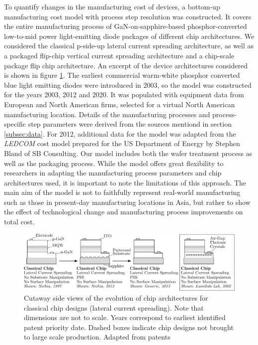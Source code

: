 \documentclass[a4paper,nocompress]{spie}  %
\begin{document}
        To quantify changes in the manufacturing cost of devices, a bottom-up manufacturing cost model with process step resolution was constructed. It covers the entire manufacturing process of GaN-on-sapphire-based phosphor-converted low-to-mid power light-emitting diode packages of different chip architectures. We considered the classical p-side-up lateral current spreading architecture, as well as a packaged flip-chip vertical current spreading architecture and a chip-scale package flip chip architecture. An excerpt of the device architectures considered is shown in figure \ref{fig:chip_arch}. The earliest commercial warm-white phosphor converted blue light emitting diodes were introduced in 2003, so the model was constructed for the years 2003, 2012 and 2020. It was populated with equipment data from European and North American firms, selected for a virtual North American manufacturing location. Details of the manufacturing processes and process-specific step parameters were derived from the sources mentiond in section \ref{subsec:data}. For 2012, additional data for the model was adapted from the \textit{LEDCOM} cost model prepared for the US Department of Energy by Stephen Bland of SB Consulting\cite{ledcomv2}. Our model includes both the wafer treatment process as well as the packaging process. While the model offers great flexibility to researchers in adapting the manufacturing process parameters and chip architectures used, it is important to note the limitations of this approach. The main aim of the model is not to faithfully represent real-world manufacturing such as those in present-day manufacturing locations in Asia, but rather to show the effect of technological change and manufacturing process improvements on total cost. 

        \begin{figure} [ht]
            \begin{center}
                \includegraphics[width=\textwidth]{SPIE/article/chip_architectures.pdf}
            \end{center}
            \caption{Cutaway side views of the evolution of chip architectures for classical chip designs (lateral current spreading). Note that dimensions are not to scale. Years correspond to earliest identified patent priority date. Dashed boxes indicate chip designs not brought to large scale production. Adapted from patents \cite{nagahama2013nitride,tanaka2010semiconductor,wierer2006photonic}}
            \label{fig:chip_arch}
        \end{figure}
\end{document}

